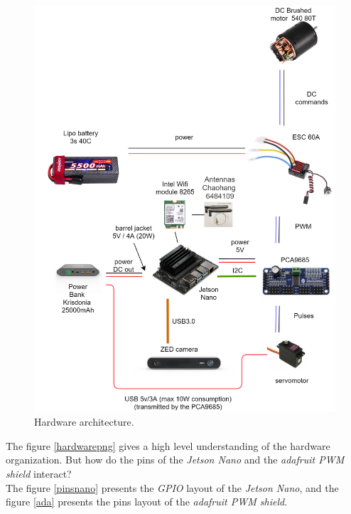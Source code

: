 		\FloatBarrier

		\begin{figure}[!htbp]
			\centering
			\includegraphics[width=1.0\columnwidth, height = 1.3\columnwidth]{imgs/hardware.png}
			\caption{Hardware architecture.}
			\label{hardwarepng}
		\end{figure}

		\FloatBarrier
		
		The figure \vref{hardwarepng} gives a high level understanding of the 
		hardware organization. But how do the pins of the \textit{Jetson Nano} and the
		\textit{adafruit PWM shield} interact?
		\\\indent The figure \vref{pinsnano} presents the \textit{GPIO} layout of the 
		\textit{Jetson Nano}, and the figure \vref{ada} presents the 
		pins layout of the \textit{adafruit PWM shield}.
		
		\FloatBarrier
		
